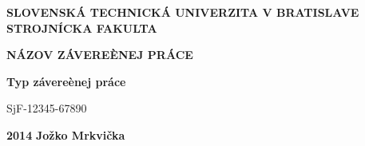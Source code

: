 \renewcommand\thepage{\roman{page}}
\thispagestyle{empty}

\noindent \begin{center}
\textbf{{\large{}SLOVENSKÁ TECHNICKÁ UNIVERZITA V BRATISLAVE}}\\
\textbf{{\large{}STROJNÍCKA FAKULTA}}\textbf{\large{} }\\
\vspace{3cm}
\par\end{center}

\noindent \begin{center}
\vspace{3cm}
\par\end{center}



\begin{center}
\textbf{\textsc{\Large{}NÁZOV ZÁVEREÈNEJ PRÁCE}}\\
\par\end{center}{\Large \par}

\begin{center}
\textbf{\large{}Typ závereènej práce}\\
\par\end{center}{\large \par}

\begin{center}
{\large{}SjF-12345-67890}\\
\par\end{center}{\large \par}



\vfill
\noindent \textbf{\large{}2014} \hfill \textbf{\large{}Jožko Mrkvička}
\cleardoublepage 
